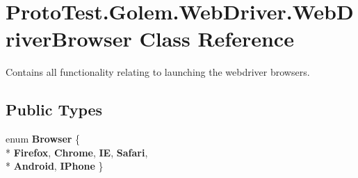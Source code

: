 \hypertarget{class_proto_test_1_1_golem_1_1_web_driver_1_1_web_driver_browser}{\section{Proto\-Test.\-Golem.\-Web\-Driver.\-Web\-Driver\-Browser Class Reference}
\label{class_proto_test_1_1_golem_1_1_web_driver_1_1_web_driver_browser}
}


Contains all functionality relating to launching the webdriver browsers.  


\subsection*{Public Types}
\begin{DoxyCompactItemize}
\item 
enum {\bfseries Browser} \{ \\*
{\bfseries Firefox}, 
{\bfseries Chrome}, 
{\bfseries I\-E}, 
{\bfseries Safari}, 
\\*
{\bfseries Android}, 
{\bfseries I\-Phone}
 \}
\end{DoxyCompactItemize}
